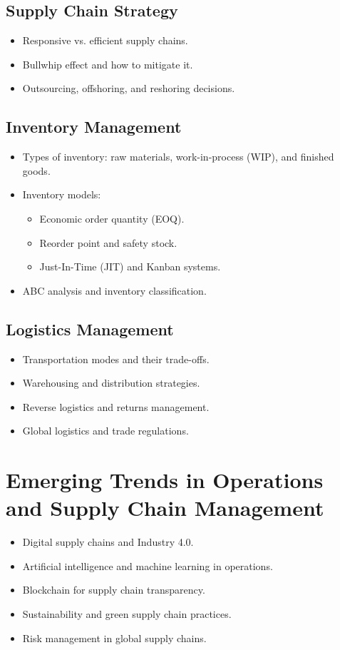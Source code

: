 \subsection{Supply Chain Strategy}
\begin{itemize}
    \item Responsive vs. efficient supply chains.
    \item Bullwhip effect and how to mitigate it.
    \item Outsourcing, offshoring, and reshoring decisions.
\end{itemize}

\subsection{Inventory Management}
\begin{itemize}
    \item Types of inventory: raw materials, work-in-process (WIP), and finished goods.
    \item Inventory models:
    \begin{itemize}
        \item Economic order quantity (EOQ).
        \item Reorder point and safety stock.
        \item Just-In-Time (JIT) and Kanban systems.
    \end{itemize}
    \item ABC analysis and inventory classification.
\end{itemize}

\subsection{Logistics Management}
\begin{itemize}
    \item Transportation modes and their trade-offs.
    \item Warehousing and distribution strategies.
    \item Reverse logistics and returns management.
    \item Global logistics and trade regulations.
\end{itemize}

\section{Emerging Trends in Operations and Supply Chain Management}
\begin{itemize}
    \item Digital supply chains and Industry 4.0.
    \item Artificial intelligence and machine learning in operations.
    \item Blockchain for supply chain transparency.
    \item Sustainability and green supply chain practices.
    \item Risk management in global supply chains.
\end{itemize}

